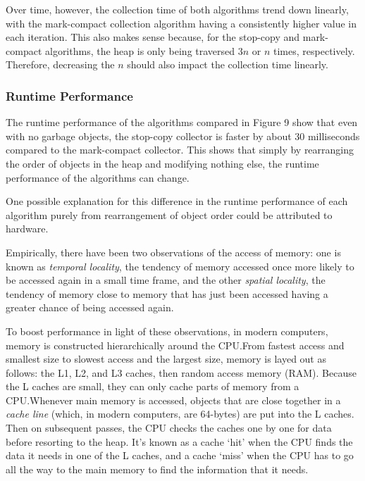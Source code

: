 \documentclass[index]{subfiles}
\begin{document}
Over time, however, the collection time of both algorithms trend down linearly, with the mark-compact collection algorithm having a consistently higher value in each iteration. This also makes sense because, for the stop-copy and mark-compact algorithms, the heap is only being traversed \(3n\) or \(n\) times, respectively. Therefore, decreasing the \(n\) should also impact the collection time linearly.

\subsubsection{Runtime Performance}

The runtime performance of the algorithms compared in Figure 9 show that even with no garbage objects, the stop-copy collector is faster by about 30 milliseconds compared to the mark-compact collector. This shows that simply by rearranging the order of objects in the heap and modifying nothing else, the runtime performance of the algorithms can change.

One possible explanation for this difference in the runtime performance of each algorithm purely from rearrangement of object order could be attributed to hardware.

Empirically, there have been two observations of the access of memory: one is known as \textit{temporal locality}, the tendency of memory accessed once more likely to be accessed again in a small time frame, and the other \textit{spatial locality}, the tendency of memory close to memory that has just been accessed having a greater chance of being accessed again\cite[18:21]{oracledevelopersCachingUnderstandMeasure2015}.

To boost performance in light of these observations, in modern computers, memory is constructed hierarchically\cite{simondevCanJavaScriptGo2021} around the CPU.\@ From fastest access and smallest size to slowest access and the largest size, memory is layed out as follows: the L1, L2, and L3 caches, then random access memory (RAM)\cite{simondevCanJavaScriptGo2021}. Because the L caches are small, they can only cache parts of memory from a CPU.\@ Whenever main memory is accessed, objects that are close together in a \textit{cache line} (which, in modern computers, are 64-bytes) are put into the L caches\cites{simondevCanJavaScriptGo2021}{code_project}. Then on subsequent passes, the CPU checks the caches one by one for data before resorting to the heap. It's known as a cache `hit' when the CPU finds the data it needs in one of the L caches, and a cache `miss'\cite{simondevCanJavaScriptGo2021} when the CPU has to go all the way to the main memory to find the information that it needs.
\end{document}
